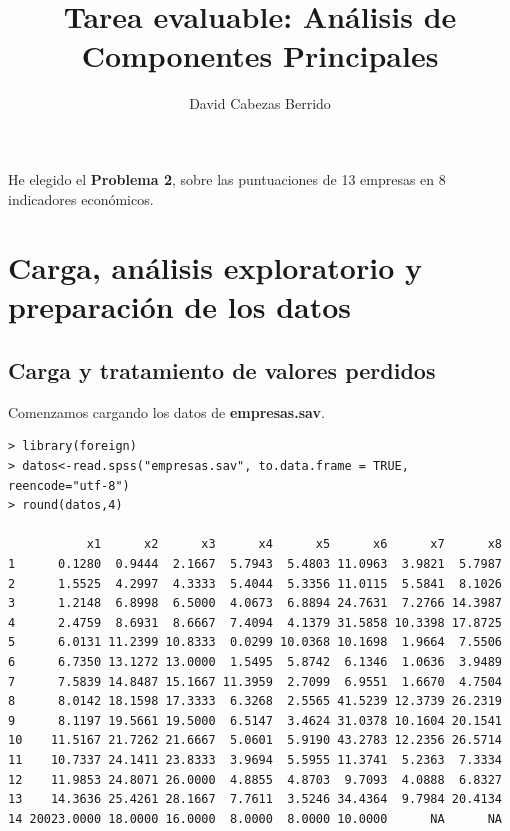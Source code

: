\documentclass[12pt]{article}
\title{Tarea evaluable: Análisis de Componentes Principales}
\author{David Cabezas Berrido}
\date{}
\begin{document}
\maketitle
\tableofcontents

\pagebreak

He elegido el \textbf{Problema 2}, sobre las puntuaciones de 13 empresas en 8 indicadores económicos. 
\vspace{-7mm}
\section{Carga, análisis exploratorio y preparación de los datos}

\subsection{Carga y tratamiento de valores perdidos}

Comenzamos cargando los datos de \textbf{empresas.sav}.

\begin{verbatim}
> library(foreign)
> datos<-read.spss("empresas.sav", to.data.frame = TRUE, reencode="utf-8")
> round(datos,4)

           x1      x2      x3      x4      x5      x6      x7      x8
1      0.1280  0.9444  2.1667  5.7943  5.4803 11.0963  3.9821  5.7987
2      1.5525  4.2997  4.3333  5.4044  5.3356 11.0115  5.5841  8.1026
3      1.2148  6.8998  6.5000  4.0673  6.8894 24.7631  7.2766 14.3987
4      2.4759  8.6931  8.6667  7.4094  4.1379 31.5858 10.3398 17.8725
5      6.0131 11.2399 10.8333  0.0299 10.0368 10.1698  1.9664  7.5506
6      6.7350 13.1272 13.0000  1.5495  5.8742  6.1346  1.0636  3.9489
7      7.5839 14.8487 15.1667 11.3959  2.7099  6.9551  1.6670  4.7504
8      8.0142 18.1598 17.3333  6.3268  2.5565 41.5239 12.3739 26.2319
9      8.1197 19.5661 19.5000  6.5147  3.4624 31.0378 10.1604 20.1541
10    11.5167 21.7262 21.6667  5.0601  5.9190 43.2783 12.2356 26.5714
11    10.7337 24.1411 23.8333  3.9694  5.5955 11.3741  5.2363  7.3334
12    11.9853 24.8071 26.0000  4.8855  4.8703  9.7093  4.0888  6.8327
13    14.3636 25.4261 28.1667  7.7611  3.5246 34.4364  9.7984 20.4134
14 20023.0000 18.0000 16.0000  8.0000  8.0000 10.0000      NA      NA
\end{verbatim}
\end{document}
